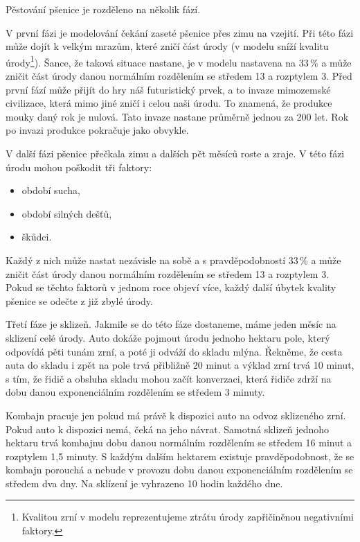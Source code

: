 \documentclass[a4paper, 11pt, hidelinks]{article}
\begin{document}
Pěstování pšenice je rozděleno na několik fází.

V první fázi je modelování čekání zaseté pšenice přes zimu na vzejití.
Při této fázi může dojít k velkým mrazům, které zničí část úrody (v modelu sníží kvalitu úrody\footnote{Kvalitou zrní v modelu reprezentujeme ztrátu úrody zapřičiněnou negativními faktory.})\cite{AgroManualPrezimovani}.
Šance, že taková situace nastane, je v modelu nastavena na 33\,\%\cite{CHMU} a může zničit část úrody danou normálním rozdělením se středem 13 a rozptylem 3.
Před první fází může přijít do hry náš futuristický prvek, a to invaze mimozemské civilizace, která mimo jiné zničí i celou naši úrodu.
To znamená, že produkce mouky daný rok je nulová.
Tato invaze nastane průměrně jednou za 200 let.
Rok po invazi produkce pokračuje jako obvykle. 

V další fázi pšenice přečkala zimu a dalších pět měsíců roste a zraje.
V této fázi úrodu mohou poškodit tři faktory: 
\begin{itemize}
    \item období sucha\cite{AgroManual},
    \item období silných dešťů\cite{AgroManualPoskozeni2021},
    \item škůdci\cite{BittnerSkodliveOrganismy}.
\end{itemize}
Každý z nich může nastat nezávisle na sobě a s pravděpodobností 33\,\% a může zničit část úrody danou normálním rozdělením se středem 13 a rozptylem 3.
Pokud se těchto faktorů v jednom roce objeví více, každý další úbytek kvality pšenice se odečte z již zbylé úrody.

Třetí fáze je sklizeň. Jakmile se do této fáze dostaneme, máme jeden měsíc na sklizení celé úrody.
Auto dokáže pojmout úrodu jednoho hektaru pole, který odpovídá pěti tunám zrní, a poté ji odváží do skladu mlýna.
Řekněme, že cesta auta do skladu i zpět na pole trvá přibližně 20 minut a výklad zrní trvá 10 minut, s tím, že řidič a obsluha skladu mohou začít konverzaci,
která řidiče zdrží na dobu danou exponenciálním rozdělením se středem 3 minuty.

Kombajn pracuje jen pokud má právě k dispozici auto na odvoz sklizeného zrní.
Pokud auto k dispozici nemá, čeká na jeho návrat.
Samotná sklizeň jednoho hektaru trvá kombajnu dobu danou normálním rozdělením se středem 16 minut a rozptylem 1,5 minuty.
S každým dalším hektarem existuje pravděpodobnost, že se kombajn porouchá a nebude v provozu dobu danou exponenciálním rozdělením se středem dva dny.
Na sklízení je vyhrazeno 10 hodin každého dne. 
\end{document}
